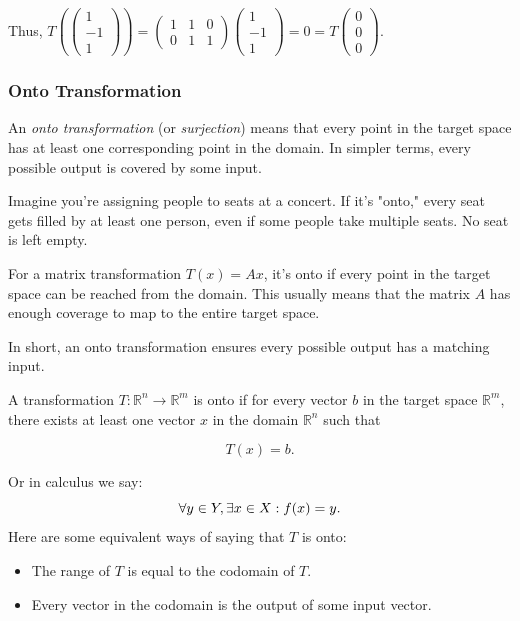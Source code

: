 \documentclass[a4paper,12pt]{article}
\begin{document}
Thus, \( T\left( \begin{pmatrix} 1 \\ -1 \\ 1 \end{pmatrix} \right) = 
\begin{pmatrix}
    1 & 1 & 0\\
    0 & 1 & 1
\end{pmatrix}\begin{pmatrix}
    1\\-1\\1
\end{pmatrix}
= 0 = T\begin{pmatrix}
    0\\0\\0
\end{pmatrix} \).

\subsubsection{Onto Transformation}
An \textit{onto transformation} (or \textit{surjection}) means that every point in the target space has at least one corresponding point in the domain. In simpler terms, every possible output is covered by some input.

Imagine you're assigning people to seats at a concert. If it's "onto," every seat gets filled by at least one person, even if some people take multiple seats. No seat is left empty.

For a matrix transformation \( T(x) = Ax \), it's onto if every point in the target space can be reached from the domain. This usually means that the matrix \( A \) has enough coverage to map to the entire target space.

In short, an onto transformation ensures every possible output has a matching input.

\begin{tcolorbox}[title=Definition (Onto Transformation),colframe=blue!70!black, colback=blue!5!white]
A transformation \( T: \mathbb{R}^n \to \mathbb{R}^m \) is onto if for every vector \( b \) in the target space \( \mathbb{R}^m \), there exists at least one vector \( x \) in the domain \( \mathbb{R}^n \) such that 

\[T(x) = b.\]
\end{tcolorbox}
Or in calculus we say:
\[
    \forall y \in Y ,\exists x \in X : f(x) = y.\\
\]
Here are some equivalent ways of saying that $T$ is onto:
\begin{itemize}
    \item The range of $T$ is equal to the codomain of $T$.
    \item Every vector in the codomain is the output of some input vector.
\end{itemize}
\end{document}
